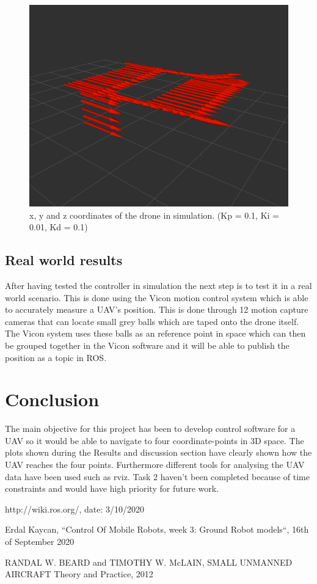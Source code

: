 \documentclass[conference]{IEEEtran}
\begin{document}
\begin{figure}[hbtp]
	\centering
	\includegraphics[width=1.0\linewidth]{images/task2_sim_rviz.png}
	\caption{x, y and z coordinates of the drone in simulation. (Kp = 0.1, Ki = 0.01, Kd = 0.1)}
	\label{fig:sim_rviz}
\end{figure}

\subsection{Real world results}
After having tested the controller in simulation the next step is to test it in a real world scenario. This is done using the Vicon motion control system which is able to accurately measure a UAV's position. This is done through 12 motion capture cameras that can locate small grey balls which are taped onto the drone itself. The Vicon system uses these balls as an reference point in space which can then be grouped together in the Vicon software and it will be able to publish the position as a topic in ROS.

\section{Conclusion}
The main objective for this project has been to develop control software for a UAV so it would be able to navigate to four coordinate-points in 3D space. The plots shown during the Results and discussion section have clearly shown how the UAV reaches the four points. Furthermore different tools for analysing the UAV data have been used such as rviz. Task 2 haven't been completed because of time constraints and would have high priority for future work.

\begin{thebibliography}{00}

 http://wiki.ros.org/, date: 3/10/2020

 Erdal Kaycan, ``Control Of Mobile Robots, week 3: Ground Robot models``, 16th of September 2020

 RANDAL W. BEARD and TIMOTHY W. McLAIN, SMALL UNMANNED AIRCRAFT Theory and Practice, 2012

\end{thebibliography}
\vspace{12pt}
\end{document}
